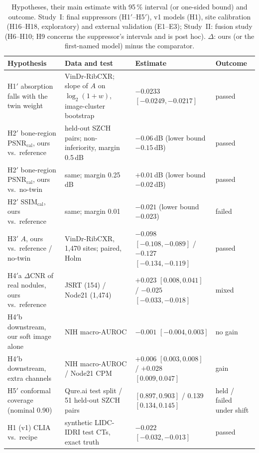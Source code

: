 \begin{table}[!t]
\centering
\caption{Hypotheses, their main estimate with 95\,\% interval (or one-sided bound) and outcome. Study~I: final suppressors (H1$'$--H5$'$),
v1 models (H1), site calibration (H16--H18, exploratory) and external validation (E1--E3); Study~II: fusion study (H6--H10; H9 concerns
the suppressor's intervals and is post hoc). $\Delta$: ours (or the first-named model) minus the comparator.}
\label{tab:hypotheses}
\footnotesize
\renewcommand{\arraystretch}{1.08}
\setlength{\tabcolsep}{3pt}
\begin{tabularx}{\textwidth}{@{}>{\raggedright\arraybackslash}p{4.3cm}>{\raggedright\arraybackslash}X%
>{\raggedright\arraybackslash}p{4.6cm}>{\raggedright\arraybackslash}p{2.3cm}@{}}
\toprule
Hypothesis & Data and test & Estimate & Outcome \\
\midrule
H1$'$ absorption falls with the twin weight & VinDr-RibCXR; slope of $A$ on $\log_2(1+w)$, image-cluster bootstrap & $-0.0233$
 $[-0.0249,-0.0217]$ & passed \\
H2$'$ bone-region PSNR$_{\mathrm{cal}}$, ours vs.\ reference & 51 held-out SZCH pairs; non-inferiority, margin 0.5\,dB & $-0.06$\,dB
 (lower bound $-0.15$\,dB) & passed \\
H2$'$ bone-region PSNR$_{\mathrm{cal}}$, ours vs.\ no-twin & same; margin 0.25\,dB & $+0.01$\,dB (lower bound $-0.02$\,dB) & passed \\
H2$'$ SSIM$_{\mathrm{cal}}$, ours vs.\ reference & same; margin 0.01 & $-0.021$ (lower bound $-0.023$) & failed \\
H3$'$ $A$, ours vs.\ reference / no-twin & VinDr-RibCXR, 1,470 sites; paired, Holm & $-0.098$ $[-0.108,-0.089]$ / $-0.127$
 $[-0.134,-0.119]$ & passed \\
H4$'$a $\Delta$CNR of real nodules, ours vs.\ reference & JSRT (154) / Node21 (1,474) & $+0.023$ $[0.008,0.041]$ / $-0.025$
 $[-0.033,-0.018]$ & mixed \\
H4$'$b downstream, our soft image alone & NIH macro-AUROC & $-0.001$ $[-0.004,0.003]$ & no gain \\
H4$'$b downstream, extra channels & NIH macro-AUROC / Node21 CPM & $+0.006$ $[0.003,0.008]$ / $+0.028$ $[0.009,0.047]$ & gain \\
H5$'$ conformal coverage (nominal 0.90) & Qure.ai test split / 51 held-out SZCH pairs & 0.900 $[0.897,0.903]$ / 0.139
 $[0.134,0.145]$ & held / failed under shift \\
H1 (v1) CLIA vs.\ recipe & synthetic LIDC-IDRI test CTs, exact truth & $-0.022$ $[-0.032,-0.013]$ & passed \\

\end{tabularx}
\end{table}
